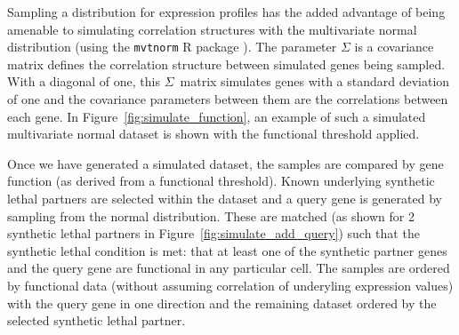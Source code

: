 Sampling a distribution for expression profiles has the added advantage of being amenable to simulating correlation structures with the multivariate normal distribution (using the \texttt{mvtnorm} R package \citep{Genz2009, mvtnorm}). The parameter $\Sigma$ is a covariance matrix defines the correlation structure between simulated genes being sampled. With a diagonal of one, this $\Sigma$\ matrix simulates genes with a standard deviation of one and the covariance parameters between them are the correlations between each gene. In Figure~\ref{fig:simulate_function}, an example of such a simulated multivariate normal dataset is shown with the functional threshold applied.

Once we have generated a simulated dataset, the samples are compared by gene function (as derived from a functional threshold). Known underlying synthetic lethal partners are selected within the dataset and a query gene is generated by sampling from the normal distribution. These are matched (as shown for 2 synthetic lethal partners in Figure~\ref{fig:simulate_add_query}) such that the synthetic lethal condition is met: that at least one of the synthetic partner genes and the query gene are functional in any particular cell. The samples are ordered by functional data (without assuming correlation of underyling expression values) with the query gene in one direction and the remaining dataset ordered by the selected synthetic lethal partner.


